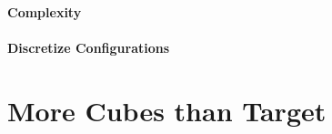 \paragraph{Complexity}


\paragraph{Discretize Configurations}





\section{More Cubes than Target}

